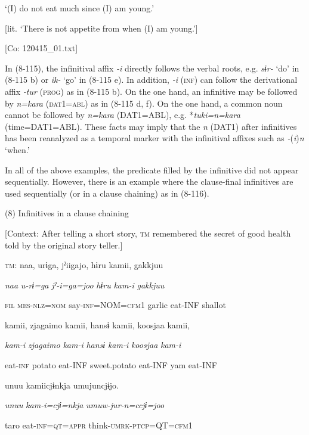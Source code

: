       ‘(I) do not eat much since (I) am young.’

[lit. ‘There is not appetite from when (I) am young.’]

      [Co: 120415\_01.txt]

In (8-115), the infinitival affix \textit{{}-i} directly follows the verbal roots, e.g. \textit{sɨr-} ‘do’ in (8-115 b) or \textit{ik-} ‘go’ in (8-115 e). In addition, \textit{{}-i} (\textsc{inf}) can follow the derivational affix \textit{{}-tur} (\textsc{prog}) as in (8-115 b). On the one hand, an infinitive may be followed by \textit{n=kara} (\textsc{dat}1=\textsc{abl}) as in (8-115 d, f). On the one hand, a common noun cannot be followed by \textit{n=kara} (DAT1=ABL), e.g. *\textit{tuki=n=kara} (time=DAT1=ABL). These facts may imply that the \textit{n} (DAT1) after infinitives has been reanalyzed as a temporal marker with the infinitival affixes such as \textit{-}(\textit{i})\textit{n} ‘when.’

In all of the above examples, the predicate filled by the infinitive did not appear sequentially. However, there is an example where the clause-final infinitives are used sequentially (or in a clause chaining) as in (8-116). 

(8)  Infinitives in a clause chaining

  [Context: After telling a short story, \textsc{tm} remembered the secret of good health told by the original story teller.]

  \textsc{tm}:  naa,  urɨga,  jˀiigajo,  hɨru  kamii,  gakkjuu

    \textit{naa}  \textit{u-rɨ=ga}  \textit{jˀ-i=ga=joo}  \textit{hɨru}  \textit{kam-i}  \textit{gakkjuu}

    \textsc{fil}  \textsc{mes}-\textsc{nlz}=\textsc{nom}  say-\textsc{inf}=NOM=\textsc{cfm}1  garlic  eat-INF  shallot

    kamii,  {\textbar}zjagaimo{\textbar}  kamii,  hansɨ  kamii,  koosjaa  kamii,

    \textit{kam-i}  \textit{zjagaimo}  \textit{kam-i}  \textit{hansɨ}  \textit{kam-i}  \textit{koosjaa}  \textit{kam-i}

    eat-\textsc{inf}  potato  eat-INF  sweet.potato  eat-INF  yam  eat-INF

    unuu  kamiicjɨnkja  umujuncjɨjo.

    \textit{unuu}  \textit{kam-i=cjɨ=nkja}  \textit{umuw-jur-n=ccjɨ=joo}

    taro  eat-\textsc{inf}=\textsc{qt}=\textsc{appr}  think-\textsc{umrk}-\textsc{ptcp}=QT=\textsc{cfm}1

